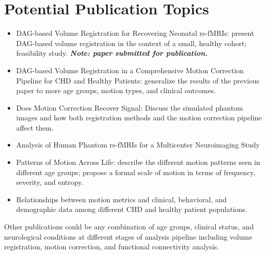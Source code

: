 \chapter{Potential Publication Topics}

\begin{itemize}
\item DAG-based Volume Registration for Recovering Neonatal rs-fMRIs:  present DAG-based volume registration in the context of a small, healthy cohort; feasibility study. \textbf{\textit{Note: paper submitted for publication.}}

\item DAG-based Volume Registration in a Comprehensive Motion Correction Pipeline for CHD and Healthy Patients: generalize the results of the previous paper to more age groups, motion types, and clinical outcomes.

\item Does Motion Correction Recover Signal: Discuss the simulated phantom images and how both registration methods and the motion correction pipeline affect them.

\item Analysis of Human Phantom rs-fMRIs for a Multicenter Neuroimaging Study

\item Patterns of Motion Across Life: describe the different motion patterns seen in different age groups; propose a formal scale of motion in terms of frequency, severity, and entropy.

\item  Relationships between motion metrics and clinical, behavioral, and demographic data among different CHD and healthy patient populations.
\end{itemize}

Other publications could be any combination of age groups, clinical status, and neurological conditions at different stages of analysis pipeline including volume registration, motion correction, and functional connectivity analysis.